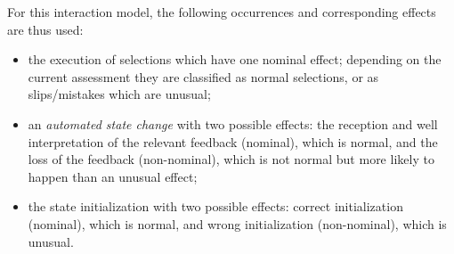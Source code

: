 For this interaction model, the following occurrences
and corresponding effects are thus used:
\begin{itemize}
\item the execution of selections which have one nominal effect; depending on the current assessment they are classified as normal selections, or as slips/mistakes which are unusual;
\item  an {\em automated state change}
with two possible effects: the reception and well interpretation of the relevant feedback (nominal), which is normal, 
and the loss of the feedback (non-nominal), which is not normal but more likely to happen than an unusual effect; 
\item  the state initialization with two possible effects: correct initialization (nominal), which is normal, and wrong initialization (non-nominal), which is unusual. 
\end{itemize}

